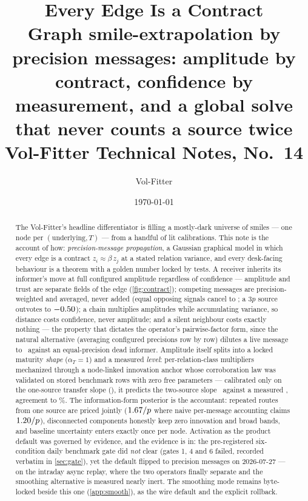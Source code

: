 \documentclass[11pt]{article}
\title{\textbf{Every Edge Is a Contract}\\[2pt]
\large Graph smile-extrapolation by precision messages: amplitude by
contract, confidence by measurement, and a global solve that never counts
a source twice\\[2pt]
\normalsize Vol-Fitter Technical Notes, No.~14}
\author{Vol-Fitter}
\date{\today}
\begin{document}
\maketitle



\begin{abstract}
The Vol-Fitter's headline differentiator is filling a mostly-dark universe
of smiles --- one node per $(\text{underlying},T)$ --- from a handful of
lit calibrations.  This note is the account of how: \emph{precision-message
propagation}, a Gaussian graphical model in which every edge is a contract
$z_i\approx\beta\,z_j$ at a stated relation variance, and every desk-facing
behaviour is a theorem with a golden number locked by tests.  A receiver
inherits its informer's move at full configured amplitude regardless of
confidence --- amplitude and trust are separate fields of the edge
(\cref{fig:contract}); competing messages are precision-weighted and
averaged, never added (equal opposing signals cancel to \gmcompetecancel;
a $3p$ source outvotes to $-0.50$); a chain multiplies amplitudes
while accumulating variance, so distance costs confidence, never
amplitude; and a silent neighbour costs exactly nothing --- the property
that dictates the operator's pairwise-factor form, since the natural
alternative (averaging configured precisions row by row) dilutes a live
message to \gmdeadhalf\ against an equal-precision dead informer.
Amplitude itself splits into a locked maturity \emph{shape}
($\alpha_T=1$) and a measured \emph{level}: per-relation-class
multipliers mechanized through a node-linked innovation anchor whose
corroboration law was validated on stored benchmark rows with zero free
parameters --- calibrated only on the one-source transfer slope
(\gmrhoindex), it predicts the two-source slope \gmpredtwo\ against a
measured \gmtwosource, agreement to \gmpredgap\%.  The information-form
posterior is the accountant: repeated routes from one source are priced
jointly ($1.67/p$ where naive per-message accounting claims
$1.20/p$), disconnected components honestly keep zero innovation
and broad bands, and baseline uncertainty enters exactly once per node.
Activation as the product default was governed by evidence, and the
evidence is in: the pre-registered six-condition daily benchmark gate did
\emph{not} clear (gates 1, 4 and 6 failed, recorded verbatim in
\cref{sec:gate}), yet the default flipped to precision messages on
2026-07-27 --- on the intraday async replay, where the two operators
finally separate and the smoothing alternative is measured nearly inert.
The smoothing mode remains byte-locked beside this one
(\cref{app:smooth}), as the wire default and the explicit rollback.
\end{abstract}
\end{document}

